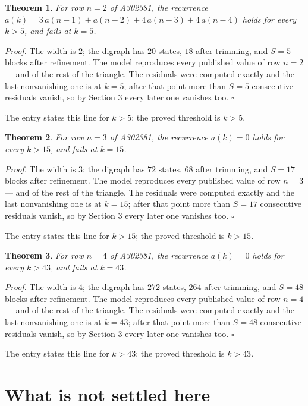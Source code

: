 \documentclass[11pt]{article}
\newtheorem{theorem}{Theorem}
\theoremstyle{definition}
\begin{document}
\begin{theorem} For row $n = 2$ of A302381, the recurrence $a(k) = 3\,a(n-1) + a(n-2) + 4\,a(n-3) + 4\,a(n-4)$ holds for every $k > 5$, and fails at $k = 5$.\end{theorem}

{\itshape Proof.} The width is $2$; the digraph has $20$ states, $18$ after trimming, and $S = 5$ blocks after refinement. The model reproduces every published value of row $n = 2$ --- and of the rest of the triangle. The residuals were computed exactly and the last nonvanishing one is at $k = 5$; after that point more than $S = 5$ consecutive residuals vanish, so by Section 3 every later one vanishes too. $\square$

The entry states this line for $k > 5$; the proved threshold is $k > 5$.

\begin{theorem} For row $n = 3$ of A302381, the recurrence $a(k) = 0$ holds for every $k > 15$, and fails at $k = 15$.\end{theorem}

{\itshape Proof.} The width is $3$; the digraph has $72$ states, $68$ after trimming, and $S = 17$ blocks after refinement. The model reproduces every published value of row $n = 3$ --- and of the rest of the triangle. The residuals were computed exactly and the last nonvanishing one is at $k = 15$; after that point more than $S = 17$ consecutive residuals vanish, so by Section 3 every later one vanishes too. $\square$

The entry states this line for $k > 15$; the proved threshold is $k > 15$.

\begin{theorem} For row $n = 4$ of A302381, the recurrence $a(k) = 0$ holds for every $k > 43$, and fails at $k = 43$.\end{theorem}

{\itshape Proof.} The width is $4$; the digraph has $272$ states, $264$ after trimming, and $S = 48$ blocks after refinement. The model reproduces every published value of row $n = 4$ --- and of the rest of the triangle. The residuals were computed exactly and the last nonvanishing one is at $k = 43$; after that point more than $S = 48$ consecutive residuals vanish, so by Section 3 every later one vanishes too. $\square$

The entry states this line for $k > 43$; the proved threshold is $k > 43$.

\section{What is not settled here}
\end{document}

